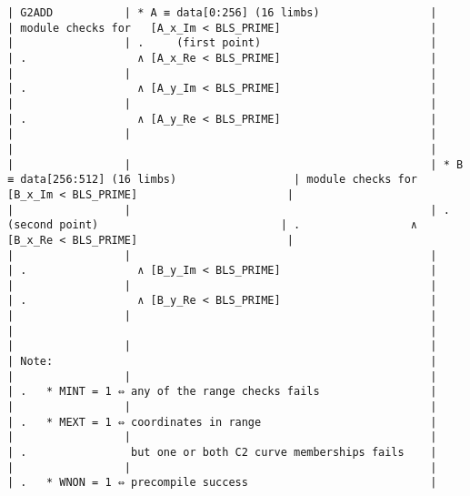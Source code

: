 \documentclass[varwidth=\maxdimen,margin=0.5cm,multi={verbatim}]{standalone}
\begin{document}
\begin{verbatim}
| G2ADD           | * A ≡ data[0:256] (16 limbs)                 |                                                 | module checks for   [A_x_Im < BLS_PRIME]                       |
|                 | .     (first point)                          |                                                 | .                 ∧ [A_x_Re < BLS_PRIME]                       |
|                 |                                              |                                                 | .                 ∧ [A_y_Im < BLS_PRIME]                       |
|                 |                                              |                                                 | .                 ∧ [A_y_Re < BLS_PRIME]                       |
|                 |                                              |                                                 |                                                                |
|                 |                                              | * B ≡ data[256:512] (16 limbs)                  | module checks for   [B_x_Im < BLS_PRIME]                       |
|                 |                                              | .     (second point)                            | .                 ∧ [B_x_Re < BLS_PRIME]                       |
|                 |                                              |                                                 | .                 ∧ [B_y_Im < BLS_PRIME]                       |
|                 |                                              |                                                 | .                 ∧ [B_y_Re < BLS_PRIME]                       |
|                 |                                              |                                                 |                                                                |
|                 |                                              |                                                 | Note:                                                          |
|                 |                                              |                                                 | .   * MINT = 1 ⇔ any of the range checks fails                 |
|                 |                                              |                                                 | .   * MEXT = 1 ⇔ coordinates in range                          |
|                 |                                              |                                                 | .                but one or both C2 curve memberships fails    |
|                 |                                              |                                                 | .   * WNON = 1 ⇔ precompile success                            |

\end{verbatim}
\end{document}

